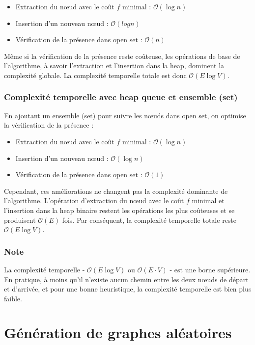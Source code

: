 \begin{itemize}
    \item Extraction du nœud avec le coût \( f \) minimal : $\mathcal{O}(\log n)$
    \item Insertion d'un nouveau nœud : $\mathcal{O}(log n)$
    \item Vérification de la présence dans open set : $\mathcal{O}(n)$
\end{itemize}

Même si la vérification de la présence reste coûteuse, les opérations de base de l'algorithme, à savoir l'extraction et l'insertion dans la heap, dominent la complexité globale. La complexité temporelle totale est donc $\mathcal{O}(E \log V)$.

\subsubsection*{Complexité temporelle avec heap queue et ensemble (set)}
En ajoutant un ensemble (set) pour suivre les nœuds dans open set, on optimise la vérification de la présence :

\begin{itemize}
    \item Extraction du nœud avec le coût \( f \) minimal : $\mathcal{O}(\log n)$
    \item Insertion d'un nouveau nœud : $\mathcal{O}(\log n)$
    \item Vérification de la présence dans open set : $\mathcal{O}(1)$
\end{itemize}

Cependant, ces améliorations ne changent pas la complexité dominante de l'algorithme. L'opération d'extraction du nœud avec le coût \( f \) minimal et l'insertion dans la heap binaire restent les opérations les plus coûteuses et se produisent $\mathcal{O}(E)$ fois. Par conséquent, la complexité temporelle totale reste $\mathcal{O}(E \log V)$.

\subsubsection*{Note}
La complexité temporelle - $\mathcal{O}(E \log V)$ ou $\mathcal{O}(E \cdot V)$ - est une borne supérieure. En pratique, à moins qu'il n'existe aucun chemin entre les deux nœuds de départ et d'arrivée, et pour une bonne heuristique, la complexité temporelle est bien plus faible.


\section{Génération de graphes aléatoires}
\label{sec:shortest_path_random_graph}

